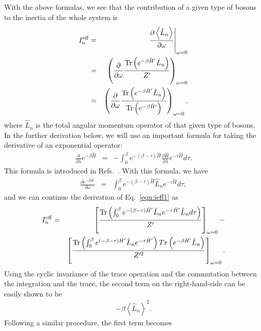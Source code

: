 \documentclass[12pt]{iopart}
\begin{document}
With the above formulas, we see that the contribution of a given type of bosons to the inertia
of the whole system is
\begin{eqnarray}
I^{\rm eff}_n&=&\left.\frac{\partial\left< \hat{L}_n \right>}{\partial \omega}\right|_{\omega=0} \nonumber\\
&=&\left(\frac{\partial}{\partial \omega} \frac{{\rm Tr} \left(e^{  -\beta \hat{H}' }\hat{L}_n\right)}{Z' }\right)_{\omega=0} \nonumber\\
&=&\left(\frac{\partial}{\partial \omega} \frac{{\rm Tr} \left(e^{ -\beta \hat{H}' }\hat{L}_n\right)}{{\rm Tr} \left(e^{ -\beta \hat{H}' }\right)}\right)_{\omega=0}, \label{eqn:ieff1}
\end{eqnarray}
where $\hat{L}_n$ is the total angular momentum operator of that given type of bosons. 
In the further derivation below, we will use an important formula for taking the derivative of an exponential operator:
\begin{eqnarray}
\frac{\partial }{\partial \lambda}e^{ -\beta \hat{H} }&=&-\int_{0}^{\beta} e^{ -\left(\beta-\tau \right)\hat{H} }\frac{\partial \hat{H}}{\partial \lambda} e^{-\tau\hat{H} }d\tau.
\end{eqnarray}
This formula is introduced in Refs.~\cite{wilcox_derivative,sinder_derivative}. 
With this formula, we have
\begin{eqnarray}
\frac{\partial e^{ -\beta\hat{H}' }}{\partial \omega}&=&\int_{0}^{\beta} e^{ -\left(\beta-\tau \right)\hat{H} }\hat{L}_n e^{ -\tau\hat{H} }d\tau,
\end{eqnarray}
and we can continue the derivation of Eq.~\ref{eqn:ieff1} as
\begin{eqnarray}
I^{\rm eff}_n&=&\left[\frac{{\rm Tr}\left( \int_0^\beta e^{ -\left( \beta-\tau\right)\hat{H}' }\hat{L}_n e^{ -\tau\hat{H}' }\hat{L}_n d\tau\right)}{Z'}\right]_{\omega=0} -\nonumber\\
&&\left[\frac{{\rm Tr}\left( \int_0^\beta e^{\left( - \beta-\tau\right)\hat{H}' }\hat{L}_n e^{ -\tau\hat{H}' } \right)Tr\left( e^{ -\beta\hat{H}' } \hat{L}_n\right)}{Z'^2}\right]_{\omega=0}.
\end{eqnarray}
Using the cyclic invariance of the trace operation and the commutation between the integration and the trace, the second term on the right-hand-side can be easily shown to be
\begin{eqnarray}
-\beta\left< \hat{L}_n\right>^2.
\end{eqnarray}
Following a similar procedure, the first term becomes
\end{document}

